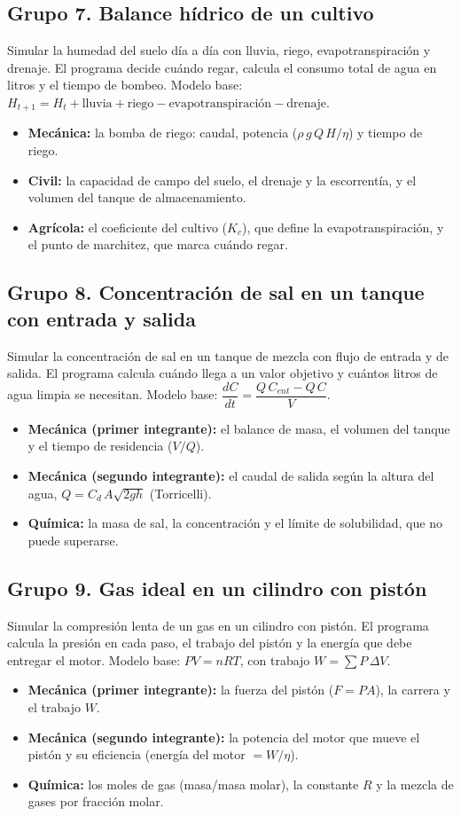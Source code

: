 \documentclass[doc]{apa6}
\begin{document}
\subsection*{Grupo 7. Balance hídrico de un cultivo}
Simular la humedad del suelo día a día con lluvia, riego, evapotranspiración y drenaje. El programa decide cuándo regar, calcula el consumo total de agua en litros y el tiempo de bombeo. Modelo base: $H_{t+1}=H_t+\text{lluvia}+\text{riego}-\text{evapotranspiración}-\text{drenaje}$.
\begin{itemize}
    \item \textbf{Mecánica:} la bomba de riego: caudal, potencia ($\rho\,g\,Q\,H/\eta$) y tiempo de riego.
    \item \textbf{Civil:} la capacidad de campo del suelo, el drenaje y la escorrentía, y el volumen del tanque de almacenamiento.
    \item \textbf{Agrícola:} el coeficiente del cultivo ($K_c$), que define la evapotranspiración, y el punto de marchitez, que marca cuándo regar.
\end{itemize}

\subsection*{Grupo 8. Concentración de sal en un tanque con entrada y salida}
Simular la concentración de sal en un tanque de mezcla con flujo de entrada y de salida. El programa calcula cuándo llega a un valor objetivo y cuántos litros de agua limpia se necesitan. Modelo base: $\dfrac{dC}{dt}=\dfrac{Q\,C_{ent}-Q\,C}{V}$.
\begin{itemize}
    \item \textbf{Mecánica (primer integrante):} el balance de masa, el volumen del tanque y el tiempo de residencia ($V/Q$).
    \item \textbf{Mecánica (segundo integrante):} el caudal de salida según la altura del agua, $Q=C_d\,A\sqrt{2gh}$ (Torricelli).
    \item \textbf{Química:} la masa de sal, la concentración y el límite de solubilidad, que no puede superarse.
\end{itemize}

\subsection*{Grupo 9. Gas ideal en un cilindro con pistón}
Simular la compresión lenta de un gas en un cilindro con pistón. El programa calcula la presión en cada paso, el trabajo del pistón y la energía que debe entregar el motor. Modelo base: $PV=nRT$, con trabajo $W=\sum P\,\Delta V$.
\begin{itemize}
    \item \textbf{Mecánica (primer integrante):} la fuerza del pistón ($F=PA$), la carrera y el trabajo $W$.
    \item \textbf{Mecánica (segundo integrante):} la potencia del motor que mueve el pistón y su eficiencia (energía del motor $=W/\eta$).
    \item \textbf{Química:} los moles de gas (masa/masa molar), la constante $R$ y la mezcla de gases por fracción molar.
\end{itemize}
\end{document}
